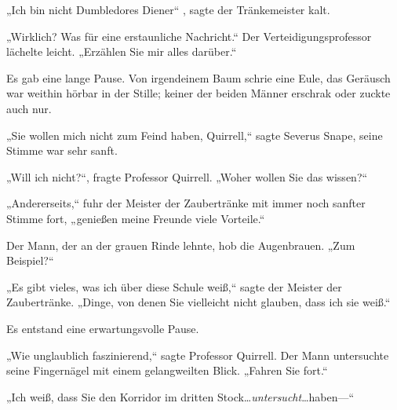 „Ich bin nicht Dumbledores Diener“ , sagte der Tränkemeister kalt.

„Wirklich? Was für eine erstaunliche Nachricht.“ Der Verteidigungsprofessor lächelte leicht. „Erzählen Sie mir alles darüber.“

Es gab eine lange Pause. Von irgendeinem Baum schrie eine Eule, das Geräusch war weithin hörbar in der Stille; keiner der beiden Männer erschrak oder zuckte auch nur.

„Sie wollen mich nicht zum Feind haben, Quirrell,“ sagte Severus Snape, seine Stimme war sehr sanft.

„Will ich nicht?“, fragte Professor Quirrell. „Woher wollen Sie das wissen?“

„Andererseits,“ fuhr der Meister der Zaubertränke mit immer noch sanfter Stimme fort, „genießen meine Freunde viele Vorteile.“

Der Mann, der an der grauen Rinde lehnte, hob die Augenbrauen. „Zum Beispiel?“

„Es gibt vieles, was ich über diese Schule weiß,“ sagte der Meister der Zaubertränke. „Dinge, von denen Sie vielleicht nicht glauben, dass ich sie weiß.“

Es entstand eine erwartungsvolle Pause.

„Wie unglaublich faszinierend,“ sagte Professor Quirrell. Der Mann untersuchte seine Fingernägel mit einem gelangweilten Blick. „Fahren Sie fort.“

„Ich weiß, dass Sie den Korridor im dritten Stock…\emph{untersucht}…haben—“

